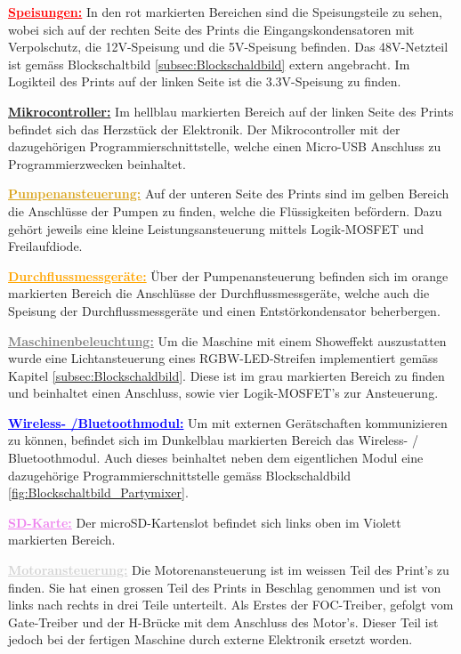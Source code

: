 \textcolor{red}{\textbf{\underline{Speisungen:}}}
In den rot markierten Bereichen sind die Speisungsteile zu sehen, wobei sich auf der rechten Seite des Prints die Eingangskondensatoren mit Verpolschutz, die 12V-Speisung und die 5V-Speisung befinden. Das 48V-Netzteil ist gemäss Blockschaltbild \ref{subsec:Blockschaldbild} extern angebracht. Im Logikteil des Prints auf der linken Seite ist die 3.3V-Speisung zu finden.

\textcolor{ProcessBlue}{\textbf{\underline{Mikrocontroller:}}}
Im hellblau markierten Bereich auf der linken Seite des Prints befindet sich das Herzstück der Elektronik. Der Mikrocontroller mit der dazugehörigen Programmierschnittstelle, welche einen Micro-USB Anschluss zu Programmierzwecken beinhaltet.

\textcolor{Goldenrod}{\textbf{\underline{Pumpenansteuerung:}}}
Auf der unteren Seite des Prints sind im gelben Bereich die Anschlüsse der Pumpen zu finden, welche die Flüssigkeiten befördern. Dazu gehört jeweils eine kleine Leistungsansteuerung mittels Logik-MOSFET und Freilaufdiode. 

\textcolor{orange}{\textbf{\underline{Durchflussmessgeräte:}}} Über der Pumpenansteuerung befinden sich im orange markierten Bereich die Anschlüsse der Durchflussmessgeräte, welche auch die Speisung der Durchflussmessgeräte und einen Entstörkondensator beherbergen.

\textcolor{gray}{\textbf{\underline{Maschinenbeleuchtung:}}}
Um die Maschine mit einem Showeffekt auszustatten wurde eine Lichtansteuerung eines RGBW-LED-Streifen implementiert gemäss Kapitel \ref{subsec:Blockschaldbild}. Diese ist im grau markierten Bereich zu finden und beinhaltet einen Anschluss, sowie vier Logik-MOSFET's zur Ansteuerung.

\textcolor{blue}{\textbf{\underline{Wireless- /Bluetoothmodul:}}}
Um mit externen Gerätschaften kommunizieren zu können, befindet sich im Dunkelblau markierten Bereich das Wireless- / Bluetoothmodul. Auch dieses beinhaltet neben dem eigentlichen Modul eine dazugehörige Programmierschnittstelle gemäss Blockschaldbild \ref{fig:Blockschaltbild_Partymixer}.

\textcolor{violet}{\textbf{\underline{SD-Karte:}}}
Der microSD-Kartenslot befindet sich links oben im Violett markierten Bereich.


\textcolor{lightgray}{\textbf{\underline{Motoransteuerung:}}}
Die Motorenansteuerung ist im weissen Teil des Print's zu finden. Sie hat einen grossen Teil des Prints in Beschlag genommen und ist von links nach rechts in drei Teile unterteilt. Als Erstes der FOC-Treiber, gefolgt vom Gate-Treiber und der H-Brücke mit dem Anschluss des Motor's. Dieser Teil ist jedoch bei der fertigen Maschine durch externe Elektronik ersetzt worden. 

